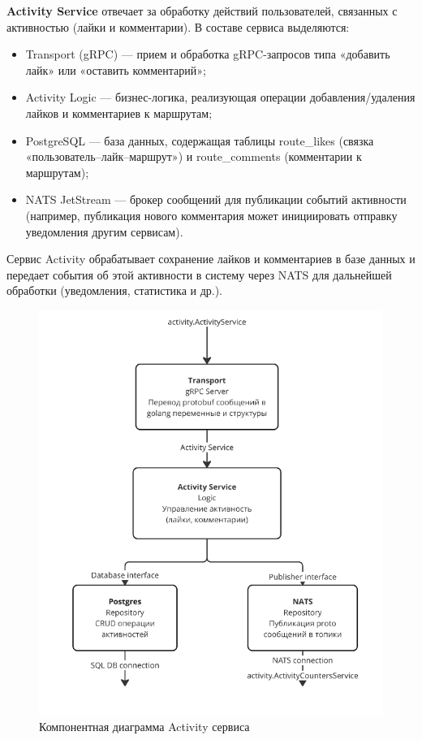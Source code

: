 \textbf{Activity Service} отвечает за обработку действий пользователей, связанных с активностью (лайки и комментарии). В составе сервиса выделяются:
\begin{itemize}
    \item Transport (gRPC) — прием и обработка gRPC-запросов типа «добавить лайк» или «оставить комментарий»;
    \item Activity Logic — бизнес-логика, реализующая операции добавления/удаления лайков и комментариев к маршрутам;
    \item PostgreSQL — база данных, содержащая таблицы route\_likes (связка «пользователь–лайк–маршрут») и route\_comments (комментарии к маршрутам);
    \item NATS JetStream — брокер сообщений для публикации событий активности (например, публикация нового комментария может инициировать отправку уведомления другим сервисам).
\end{itemize}
Сервис Activity обрабатывает сохранение лайков и комментариев в базе данных и передает события об этой активности в систему через NATS для дальнейшей обработки (уведомления, статистика и др.).
\begin{figure}[H]
        \centering
        \includegraphics[width=0.8\linewidth]{Images/second_chapter_backend_architecture/Picture5.png}
        \caption{Компонентная диаграмма Activity сервиса}
        \label{fig:activity-service-component-diagram}
\end{figure}


